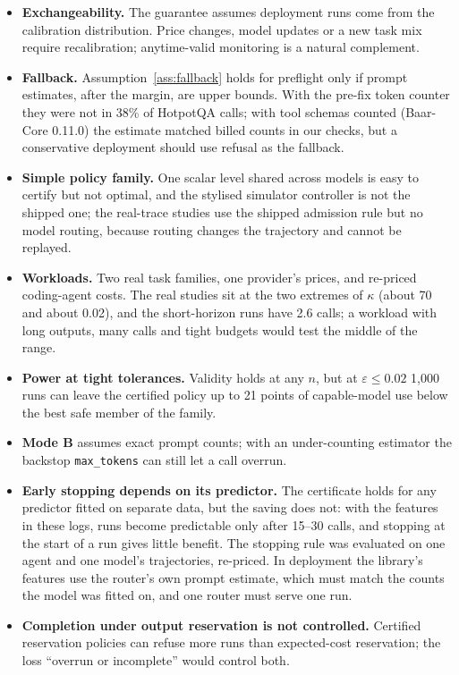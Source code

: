 \documentclass[11pt]{article}
\theoremstyle{remark}
\begin{document}
\begin{itemize}
  \item \textbf{Exchangeability.} The guarantee assumes deployment runs come
  from the calibration distribution. Price changes, model updates or a new task
  mix require recalibration; anytime-valid monitoring \citep{hultberg2026anytime}
  is a natural complement.
  \item \textbf{Fallback.} Assumption~\ref{ass:fallback} holds for preflight
  only if prompt estimates, after the margin, are upper bounds. With the
  pre-fix token counter they were not in 38\% of HotpotQA calls; with tool
  schemas counted (Baar-Core 0.11.0) the estimate matched billed counts in our
  checks, but a conservative deployment should use refusal as the fallback.
  \item \textbf{Simple policy family.} One scalar level shared across models is
  easy to certify but not optimal, and the stylised simulator controller is not
  the shipped one; the real-trace studies use the shipped admission rule but no
  model routing, because routing changes the trajectory and cannot be replayed.
  \item \textbf{Workloads.} Two real task families, one provider's prices, and
  re-priced coding-agent costs. The real studies sit at the two extremes of
  $\kappa$ (about 70 and about 0.02), and the short-horizon runs have 2.6 calls;
  a workload with long outputs, many calls and tight budgets would test the
  middle of the range.
  \item \textbf{Power at tight tolerances.} Validity holds at any $n$, but at
  $\varepsilon \le 0.02$ 1{,}000 runs can leave the certified policy up to 21
  points of capable-model use below the best safe member of the family.
  \item \textbf{Mode B} assumes exact prompt counts; with an under-counting
  estimator the backstop \texttt{max\_tokens} can still let a call overrun.
  \item \textbf{Early stopping depends on its predictor.} The certificate
  holds for any predictor fitted on separate data, but the saving does not:
  with the features in these logs, runs become predictable only after 15--30
  calls, and stopping at the start of a run gives little benefit. The
  stopping rule was evaluated on one agent and one model's trajectories,
  re-priced. In deployment the library's features use the router's own prompt
  estimate, which must match the counts the model was fitted on, and one router
  must serve one run.
  \item \textbf{Completion under output reservation is not controlled.}
  Certified reservation policies can refuse more runs than expected-cost
  reservation; the loss ``overrun or incomplete'' would control both.
\end{itemize}
\end{document}
